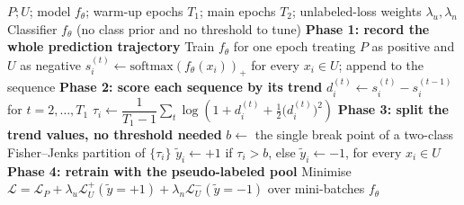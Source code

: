 \documentclass{article}
\begin{document}
\begin{algorithm}[!h]
\renewcommand{\algorithmicrequire}{\textbf{Input:}} %
\renewcommand{\algorithmicensure}{\textbf{Output:}} %
	\caption{HolisticPU (prediction-trend labeling, class-prior free)} %
	\begin{algorithmic}[1] %
	    \REQUIRE
	    $P;U$; model $f_{\theta}$; warm-up epochs $T_{1}$; main epochs $T_{2}$;
	    unlabeled-loss weights $\lambda_{u},\lambda_{n}$
	    \ENSURE
	    Classifier $f_{\theta}$ (no class prior and no threshold to tune)
	    \STATE \textbf{Phase 1: record the whole prediction trajectory}
	    \STATE Train $f_{\theta}$ for one epoch treating $P$ as positive and $U$ as negative %
	    \STATE $s_{i}^{(t)}\leftarrow \mathrm{softmax}(f_{\theta}(x_{i}))_{+}$ for every $x_{i}\in U$; append to the sequence %
	    \ENDFOR
	    \STATE \textbf{Phase 2: score each sequence by its trend}
	    \STATE $d_{i}^{(t)}\leftarrow s_{i}^{(t)}-s_{i}^{(t-1)}$ for $t=2,\dots,T_{1}$ %
	    \STATE $\tau_{i}\leftarrow \dfrac{1}{T_{1}-1}\sum_{t}\log\!\left(1+d_{i}^{(t)}+\tfrac{1}{2}\big(d_{i}^{(t)}\big)^{2}\right)$ %
	    \ENDFOR
	    \STATE \textbf{Phase 3: split the trend values, no threshold needed}
	    \STATE $b\leftarrow$ the single break point of a two-class Fisher--Jenks partition of $\{\tau_{i}\}$ %
	    \STATE $\tilde{y}_{i}\leftarrow +1$ if $\tau_{i}>b$, else $\tilde{y}_{i}\leftarrow -1$, for every $x_{i}\in U$ %
	    \STATE \textbf{Phase 4: retrain with the pseudo-labeled pool}
	    \STATE Minimise $\mathcal{L}=\mathcal{L}_{P}
	    +\lambda_{u}\mathcal{L}_{U}^{+}(\tilde{y}=+1)
	    +\lambda_{n}\mathcal{L}_{U}^{-}(\tilde{y}=-1)$ over mini-batches
	    \ENDFOR
		\RETURN $f_{\theta}$
	\end{algorithmic}
\end{algorithm}
\end{document}
